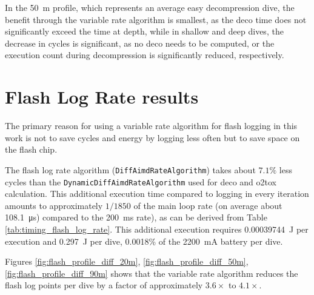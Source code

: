 In the \SI{50}{\meter} profile, which represents an average easy decompression dive, the benefit through the variable rate algorithm is smallest, as the \gls{deco} time does not significantly exceed the time at depth, while in shallow and deep dives, the decrease in cycles is significant, as no deco needs to be computed, or the execution count during decompression is significantly reduced, respectively.


\section{Flash Log Rate results}
The primary reason for using a variable rate algorithm for flash logging in this work is not to save cycles and energy by logging less often but to save space on the flash chip.

The flash log rate algorithm (\lstinline{DiffAimdRateAlgorithm}) takes about $7.1\%$ less cycles than the \lstinline{DynamicDiffAimdRateAlgorithm} used for \gls{deco} and \gls{o2tox} calculation. 
This additional execution time compared to logging in every iteration amounts to approximately $1/1850$ of the main loop rate (on average about \SI{108.1}{\micro\second}) compared to the \SI{200}{\milli\second} rate), as can be derived from Table \ref{tab:timing_flash_log_rate}.
This additional execution requires \SI{0.00039744}{\joule} per execution and \SI{0.297}{\joule} per dive, 0.0018\% of the \SI{2200}{\milli\ampere} battery per dive.


Figures \ref{fig:flash_profile_diff_20m}, \ref{fig:flash_profile_diff_50m}, \ref{fig:flash_profile_diff_90m} shows that the variable rate algorithm reduces the flash log points per dive by a factor of approximately $3.6\times$ to $4.1\times$. 

